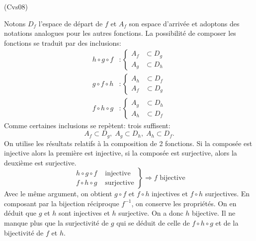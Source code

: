 \begin{tiny}(Cvs08)\end{tiny} Notons $D_f$ l'espace de départ de $f$ et $A_f$ son espace d'arrivée et adoptons des notations analogues pour les autres fonctions. La possibilité de composer les fonctions se traduit par des inclusions:
\[
\begin{aligned}
  h \circ g \circ f &: 
  \left\lbrace 
    \begin{aligned}
      A_f &\subset D_g \\
      A_g &\subset D_h
    \end{aligned}
  \right. \\
  g \circ f \circ h &: 
  \left\lbrace 
    \begin{aligned}
      A_h &\subset D_f \\
      A_f &\subset D_g
    \end{aligned}
  \right. \\
  f \circ h \circ g &: 
  \left\lbrace 
    \begin{aligned}
      A_g &\subset D_h \\
      A_h &\subset D_f
    \end{aligned}
  \right.  
\end{aligned}
\]
Comme certaines inclusions se repètent: trois suffisent:
\[
  A_f \subset D_g, \; A_g \subset D_h, \; A_h \subset D_f .
\]
On utilise les résultats relatifs à la composition de 2 fonctions. Si la composée est injective alors la première est injective, si la composée est surjective, alors la deuxième est surjective.
\begin{displaymath}
\left. 
\begin{aligned}
h \circ g \circ f &\text{ injective} \\ f \circ h \circ g &\text{ surjective}  
\end{aligned}
\right\rbrace \Rightarrow f \text{ bijective}
\end{displaymath}
Avec le même argument, on obtient $g\circ f$ et $f\circ h$ injectives et $f \circ h$ surjectives. En composant par la bijection réciproque $f^{-1}$, on conserve les propriétés. On en déduit que $g$ et $h$ sont injectives et $h$ surjective. On a donc $h$ bijective. Il ne manque plus que la surjectivité de $g$ qui se déduit de celle de $f \circ h \circ g$ et de la bijectivité de $f$ et $h$.
